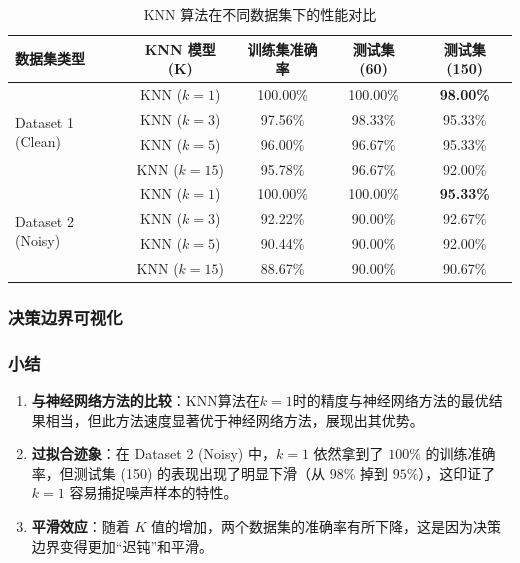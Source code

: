 \begin{table}[htbp]
	\centering
	\caption{KNN 算法在不同数据集下的性能对比}
	\label{tab:knn_results}
	\begin{tabular}{lcccc}
		\toprule
		\textbf{数据集类型} & \textbf{KNN 模型 (K)} & \textbf{训练集准确率} & \textbf{测试集 (60)} & \textbf{测试集 (150)} \\
		\midrule
		\multirow{4}{*}{Dataset 1 (Clean)} 
		& KNN ($k=1$) & 100.00\% & 100.00\% & \textbf{98.00\%} \\
		& KNN ($k=3$) & 97.56\%  & 98.33\%  & 95.33\% \\
		& KNN ($k=5$) & 96.00\%  & 96.67\%  & 95.33\% \\
		& KNN ($k=15$)& 95.78\%  & 96.67\%  & 92.00\% \\
		\midrule
		\multirow{4}{*}{Dataset 2 (Noisy)} 
		& KNN ($k=1$) & 100.00\% & 100.00\% & \textbf{95.33\%} \\
		& KNN ($k=3$) & 92.22\%  & 90.00\%  & 92.67\% \\
		& KNN ($k=5$) & 90.44\%  & 90.00\%  & 92.00\% \\
		& KNN ($k=15$)& 88.67\%  & 90.00\%  & 90.67\% \\
		\bottomrule
	\end{tabular}
\end{table}

\subsubsection{决策边界可视化}


\subsubsection{小结}
\begin{enumerate}
	\item \textbf{与神经网络方法的比较}：KNN算法在$k=1$时的精度与神经网络方法的最优结果相当，但此方法速度显著优于神经网络方法，展现出其优势。
	\item \textbf{过拟合迹象}：在 Dataset 2 (Noisy) 中，$k=1$ 依然拿到了 $100\%$ 的训练准确率，但测试集 (150) 的表现出现了明显下滑（从 $98\%$ 掉到 $95\%$），这印证了 $k=1$ 容易捕捉噪声样本的特性。
	\item \textbf{平滑效应}：随着 $K$ 值的增加，两个数据集的准确率有所下降，这是因为决策边界变得更加“迟钝”和平滑。
\end{enumerate}

